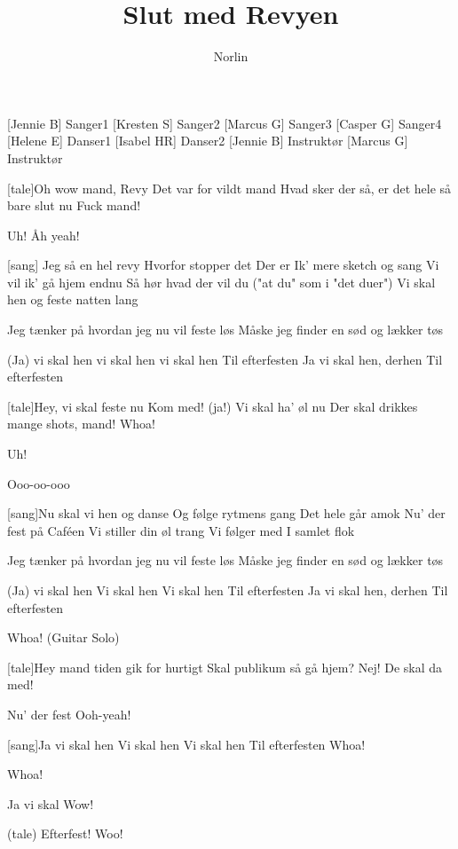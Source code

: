 \documentclass[a4paper,11pt]{article}
\title{Slut med Revyen}
\author{Norlin}
\begin{document}
\maketitle

\begin{roles}
[Jennie B] Sanger1
[Kresten S] Sanger2
[Marcus G] Sanger3
[Casper G] Sanger4
[Helene E] Danser1
[Isabel HR] Danser2
[Jennie B] Instruktør
[Marcus G] Instruktør
\end{roles}

\begin{song}
[tale]Oh wow mand, Revy
Det var for vildt mand
Hvad sker der så, er det hele så bare slut nu
Fuck mand!	

Uh!
Åh yeah!

[sang] Jeg så en hel revy	
Hvorfor stopper det
Der er Ik' mere sketch og sang
Vi vil ik' gå hjem endnu
Så hør hvad der vil du ("at du" som i "det duer")
Vi skal hen og feste natten lang

Jeg tænker på hvordan jeg nu vil feste løs
Måske jeg finder en sød og lækker tøs

(Ja) vi skal hen
vi skal hen
vi skal hen
Til efterfesten
Ja vi skal hen, derhen
Til efterfesten

[tale]Hey, vi skal feste nu
Kom med! (ja!)
Vi skal ha' øl nu
Der skal drikkes mange shots, mand!
Whoa!

Uh!

Ooo-oo-ooo

[sang]Nu skal vi hen og danse
Og følge rytmens gang
Det hele går amok
Nu' der fest på Caféen
Vi stiller din øl trang
Vi følger med I samlet flok

Jeg tænker på hvordan jeg nu vil feste løs
Måske jeg finder en sød og lækker tøs

(Ja) vi skal hen
Vi skal hen
Vi skal hen
Til efterfesten
Ja vi skal hen, derhen
Til efterfesten

Whoa!
(Guitar Solo)

[tale]Hey mand tiden gik for hurtigt
Skal publikum så gå hjem? 
Nej! De skal da med!

Nu' der fest
Ooh-yeah!

[sang]Ja vi skal hen
Vi skal hen
Vi skal hen
Til efterfesten
Whoa!

Whoa!

Ja vi skal
Wow!

(tale) Efterfest!
Woo!


\end{song}
\end{document}
